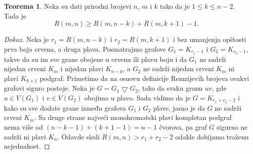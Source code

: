 \documentclass{article}
\theoremstyle{definition}
\newtheorem{teorema}{Teorema}[section]
\newcommand{\dokaz}[1]{\begin{proof}[Dokaz]#1\end{proof}}
\begin{document}
	\begin{teorema}\label{dot3}
		Neka su dati prirodni brojevi $n$, $m$ i $k$ tako da je $1\leq k \leq n - 2$. Tada je $$R(m,n) \geq R(m, n - k) + R(m, k + 1) - 1.$$ 
		\dokaz{
			Neka je $r_1 = R(m, n - k)$ i $r_2 = R(m, k + 1)$ i bez umanjenja opštosti prva boja crvena, a druga plava. Posmatrajmo grafove 
			$G_1 =K_{r_1 - 1}$ i $G_2 = K_{r_2 - 1}$, takve da su im sve grane obojene u crvenu ili plavu boju i da $G_1$ ne sadrži nijedan crveni $K_m$ i
			nijedan plavi $K_{n - k}$, a $G_2$ ne sadrži nijedan crveni $K_m$ ni plavi $K_{k + 1}$ podgraf. Primetimo da na osnovu definicije Remzijevih
			brojeva ovakvi grafovi siguro postoje. Neka je $G = G_1 \bigtriangledown G_2$, tako da svaku granu $uv$, gde $u \in V(G_1)$ i $v \in V(G_2)$
			obojimo u plavo. Sada vidimo da je $G = K_{r_1 + r_2 - 2}$ i kako su sve dodate grane između grafova $G_1$ i $G_2$ plave, jasno je da $G$ ne
			sadrži crveni $K_m$. Sa druge strane najveći monohromatski plavi kompletan podgraf nema više od $(n - k - 1) + (k + 1 - 1) = n - 1$ čvorova, pa 			graf $G$ sigurno ne sadrži ni plavi $K_n$. Odavde sledi $R(m,n) > r_1 + r_2 - 2$ odakle dobijamo traženu nejednakost. 
		}
	\end{teorema}
\end{document}
